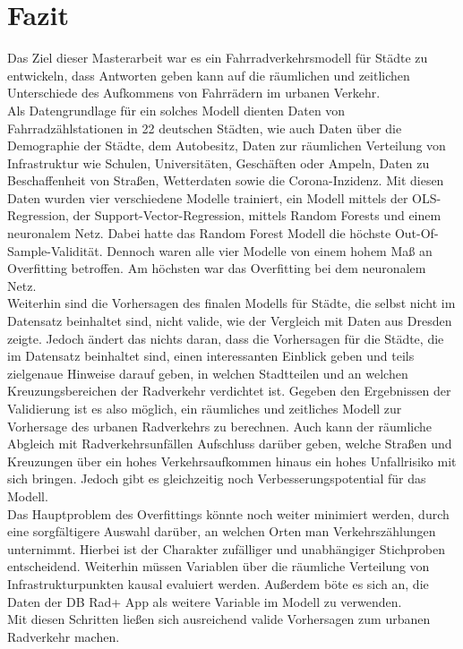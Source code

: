 \documentclass[a4paper,12pt]{thesis}
\begin{document}
\section{Fazit}

Das Ziel dieser Masterarbeit war es ein Fahrradverkehrsmodell für Städte zu entwickeln, dass Antworten geben kann auf die räumlichen und zeitlichen Unterschiede des Aufkommens von Fahrrädern im urbanen Verkehr.\\
Als Datengrundlage für ein solches Modell dienten Daten von Fahrradzählstationen in 22 deutschen Städten, wie auch Daten über die Demographie der Städte, dem Autobesitz, Daten zur räumlichen Verteilung von Infrastruktur wie Schulen, Universitäten, Geschäften oder Ampeln, Daten zu Beschaffenheit von Straßen, Wetterdaten sowie die Corona-Inzidenz. Mit diesen Daten wurden vier verschiedene Modelle trainiert, ein Modell mittels der OLS-Regression, der Support-Vector-Regression, mittels Random Forests und einem neuronalem Netz. Dabei hatte das Random Forest Modell die höchste Out-Of-Sample-Validität. Dennoch waren alle vier Modelle von einem hohem Maß an Overfitting betroffen. Am höchsten war das Overfitting bei dem neuronalem Netz.\\
Weiterhin sind die Vorhersagen des finalen Modells für Städte, die selbst nicht im Datensatz beinhaltet sind, nicht valide, wie der Vergleich mit Daten aus Dresden zeigte. Jedoch ändert das nichts daran, dass die Vorhersagen für die Städte, die im Datensatz beinhaltet sind, einen interessanten Einblick geben und teils zielgenaue Hinweise darauf geben, in welchen Stadtteilen und an welchen Kreuzungsbereichen der Radverkehr verdichtet ist. Gegeben den Ergebnissen der Validierung ist es also möglich, ein räumliches und zeitliches Modell zur Vorhersage des urbanen Radverkehrs zu berechnen. Auch kann der räumliche Abgleich mit Radverkehrsunfällen Aufschluss darüber geben, welche Straßen und Kreuzungen über ein hohes Verkehrsaufkommen hinaus ein hohes Unfallrisiko mit sich bringen. Jedoch gibt es gleichzeitig noch Verbesserungspotential für das Modell.\\
Das Hauptproblem des Overfittings könnte noch weiter minimiert werden, durch eine sorgfältigere Auswahl darüber, an welchen Orten man Verkehrszählungen unternimmt. Hierbei ist der Charakter zufälliger und unabhängiger Stichproben entscheidend. Weiterhin müssen Variablen über die räumliche Verteilung von Infrastrukturpunkten kausal evaluiert werden. Außerdem böte es sich an, die Daten der DB Rad+ App als weitere Variable im Modell zu verwenden.\\
Mit diesen Schritten ließen sich ausreichend valide Vorhersagen zum urbanen Radverkehr machen.
\end{document}
